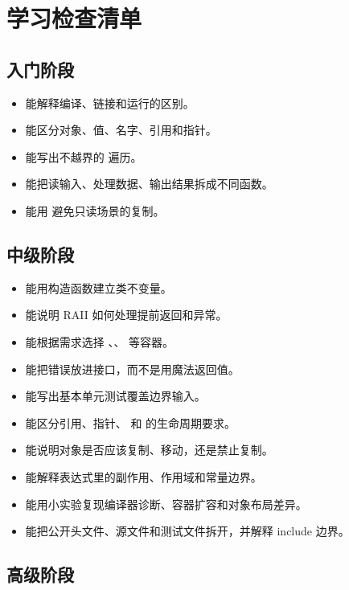 \chapter{学习检查清单}

\section{入门阶段}

\begin{itemize}
  \item 能解释编译、链接和运行的区别。
  \item 能区分对象、值、名字、引用和指针。
  \item 能写出不越界的  遍历。
  \item 能把读输入、处理数据、输出结果拆成不同函数。
  \item 能用  避免只读场景的复制。
\end{itemize}

\section{中级阶段}

\begin{itemize}
  \item 能用构造函数建立类不变量。
  \item 能说明 RAII 如何处理提前返回和异常。
  \item 能根据需求选择 、、 等容器。
  \item 能把错误放进接口，而不是用魔法返回值。
  \item 能写出基本单元测试覆盖边界输入。
  \item 能区分引用、指针、 和  的生命周期要求。
  \item 能说明对象是否应该复制、移动，还是禁止复制。
  \item 能解释表达式里的副作用、作用域和常量边界。
  \item 能用小实验复现编译器诊断、容器扩容和对象布局差异。
  \item 能把公开头文件、源文件和测试文件拆开，并解释 include 边界。
\end{itemize}

\section{高级阶段}

